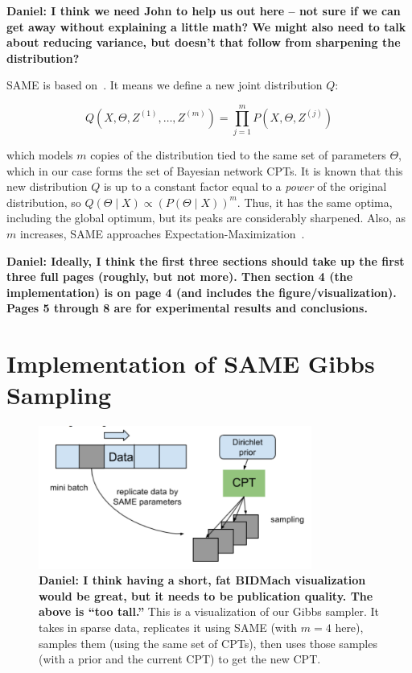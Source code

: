 \documentclass{article} %
\begin{document}
\textbf{Daniel: I think we need John to help us out here -- not sure if we can get away without
explaining a little math? We might also need to talk about reducing variance, but doesn't that
follow from sharpening the distribution?}

SAME is based on~\citep{SAME2002}. It means we define a new joint distribution $Q$:

\begin{equation}\label{eq:same}
Q(X,\Theta,Z^{(1)},\ldots,Z^{(m)}) = \prod_{j=1}^m P(X,\Theta,Z^{(j)})
\end{equation}

which models $m$ copies of the distribution tied to the same set of parameters $\Theta$, which in
our case forms the set of Bayesian network CPTs. It is known that this new distribution $Q$ is up to
a constant factor equal to a \emph{power} of the original distribution, so $Q(\Theta \mid X) \propto
(P(\Theta \mid X))^m$. Thus, it has the same optima, including the global optimum, but its peaks are
considerably sharpened. Also, as $m$ increases, SAME approaches
Expectation-Maximization~\citep{EMpaper}.

\textbf{Daniel: Ideally, I think the first three sections should take up the first three full pages
(roughly, but not more). Then section 4 (the implementation) is on page 4 (and includes the
figure/visualization). Pages 5 through 8 are for experimental results and conclusions.}




\section{Implementation of SAME Gibbs Sampling}\label{sec:implementation}

\begin{figure}[t]
\centering
\includegraphics[width=0.8\textwidth]{fig_BIDMach_flow_DRAFT}
\caption{\textbf{Daniel: I think having a short, fat BIDMach visualization would be great, but it needs
to be publication quality. The above is ``too tall.''} This is a visualization of our Gibbs sampler.
It takes in sparse data, replicates it using SAME (with $m=4$ here), samples them (using the same
set of CPTs), then uses those samples (with a prior and the current CPT) to get the new CPT.}
\label{fig:BIDMach}
\end{figure}
\end{document}
